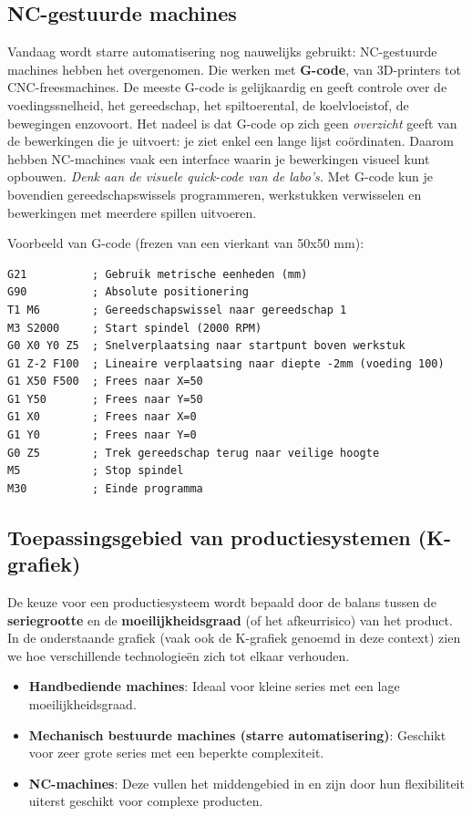 \documentclass[a4paper,11pt,twoside]{report}
\begin{document}
\subsection{NC-gestuurde machines}

Vandaag wordt starre automatisering nog nauwelijks gebruikt: NC-gestuurde machines hebben het overgenomen.
Die werken met \textbf{G-code}, van 3D-printers tot CNC-freesmachines.
De meeste G-code is gelijkaardig en geeft controle over de voedingssnelheid, het gereedschap,
het spiltoerental, de koelvloeistof, de bewegingen enzovoort.
Het nadeel is dat G-code op zich geen \emph{overzicht} geeft van de bewerkingen die je uitvoert:
je ziet enkel een lange lijst coördinaten.
Daarom hebben NC-machines vaak een interface waarin je bewerkingen visueel kunt opbouwen.
\textit{Denk aan de visuele quick-code van de labo's.}
Met G-code kun je bovendien gereedschapswissels programmeren, werkstukken verwisselen
en bewerkingen met meerdere spillen uitvoeren.


Voorbeeld van G-code (frezen van een vierkant van 50x50 mm):
\begin{tcolorbox}[colback=black!5,colframe=black!50,title=G-code Voorbeeld]
    \begin{verbatim}
G21          ; Gebruik metrische eenheden (mm)
G90          ; Absolute positionering
T1 M6        ; Gereedschapswissel naar gereedschap 1
M3 S2000     ; Start spindel (2000 RPM)
G0 X0 Y0 Z5  ; Snelverplaatsing naar startpunt boven werkstuk
G1 Z-2 F100  ; Lineaire verplaatsing naar diepte -2mm (voeding 100)
G1 X50 F500  ; Frees naar X=50
G1 Y50       ; Frees naar Y=50
G1 X0        ; Frees naar X=0
G1 Y0        ; Frees naar Y=0
G0 Z5        ; Trek gereedschap terug naar veilige hoogte
M5           ; Stop spindel
M30          ; Einde programma
\end{verbatim}
\end{tcolorbox}


\subsection{Toepassingsgebied van productiesystemen (K-grafiek)}
De keuze voor een productiesysteem wordt bepaald door de balans tussen de \textbf{seriegrootte} en de \textbf{moeilijkheidsgraad}
(of het afkeurrisico) van het product.
In de onderstaande grafiek (vaak ook de K-grafiek genoemd in deze context) zien we hoe verschillende technologieën
zich tot elkaar verhouden.

\begin{itemize}
    \item \textbf{Handbediende machines}: Ideaal voor kleine series met een lage moeilijkheidsgraad.
    \item \textbf{Mechanisch bestuurde machines (starre automatisering)}: Geschikt voor zeer grote series met een beperkte complexiteit.
    \item \textbf{NC-machines}: Deze vullen het middengebied in en zijn door hun flexibiliteit uiterst geschikt voor complexe producten.
\end{itemize}
\end{document}
